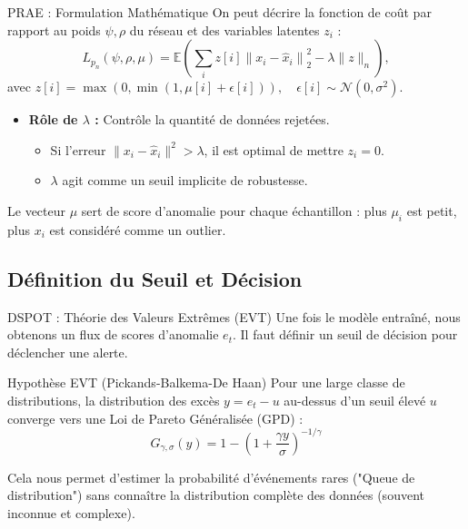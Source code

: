 \documentclass{beamer}
\begin{document}
\begin{frame}{PRAE : Formulation Mathématique}
    On peut décrire la fonction de coût par rapport au poids $\psi, \rho$ du réseau et des variables latentes $z_i$ : $$L_{p_n}(\psi, \rho, \mu) = \mathbb{E}\left( \sum_i z[i] \left\|x_i - \hat{x}_i\right\|_2^2 - \lambda \|z\|_n  \right),$$ avec $z[i] = \max\left(0, \min\left(1, \mu[i] + \epsilon[i]\right)\right), \quad \epsilon[i] \sim \mathcal{N}(0, \sigma^2)$.

    \vspace{0.3cm}
    \begin{itemize}
        \item \textbf{Rôle de $\lambda$ :} Contrôle la quantité de données rejetées.
        \begin{itemize}
            \item Si l'erreur $\| x_i - \hat{x}_i \|^2 > \lambda$, il est optimal de mettre $z_i = 0$.
            \item $\lambda$ agit comme un seuil implicite de robustesse.
        \end{itemize}
    \end{itemize}
    
    Le vecteur $\mu$ sert de score d'anomalie pour chaque échantillon : plus $\mu_i$ est petit, plus $x_i$ est considéré comme un outlier.
\end{frame}

\subsection{Définition du Seuil et Décision}
\begin{frame}{DSPOT : Théorie des Valeurs Extrêmes (EVT)}
    Une fois le modèle entraîné, nous obtenons un flux de scores d'anomalie $e_t$. Il faut définir un seuil de décision pour déclencher une alerte.
    
    \begin{block}{Hypothèse EVT (Pickands-Balkema-De Haan)}
        Pour une large classe de distributions, la distribution des excès $y = e_t - u$ au-dessus d'un seuil élevé $u$ converge vers une Loi de Pareto Généralisée (GPD) :
        $$ G_{\gamma, \sigma}(y) = 1 - \left( 1 + \frac{\gamma y}{\sigma} \right)^{-1/\gamma} $$
    \end{block}
    
    Cela nous permet d'estimer la probabilité d'événements rares ("Queue de distribution") sans connaître la distribution complète des données (souvent inconnue et complexe).
\end{frame}
\end{document}
